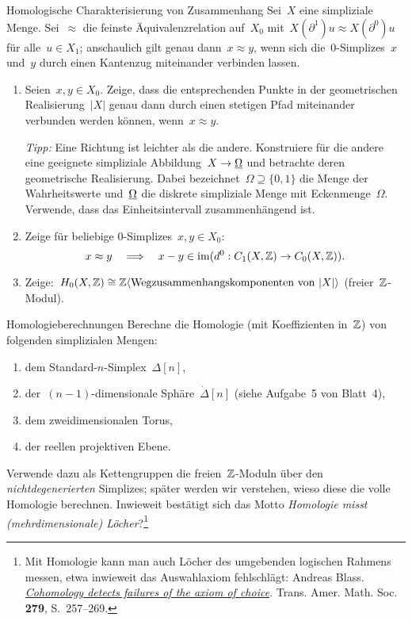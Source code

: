 \documentclass{uebblatt}
\begin{document}

\begin{aufgabe}{Homologische Charakterisierung von Zusammenhang}
Sei~$X$ eine simpliziale Menge. Sei~$\approx$ die feinste Äquivalenzrelation
auf~$X_0$ mit~$X(\partial^1)u \approx X(\partial^0)u$ für alle~$u \in X_1$;
anschaulich gilt genau dann~$x \approx y$, wenn sich die~0-Simplizes~$x$
und~$y$ durch einen Kantenzug miteinander verbinden lassen.
\begin{enumerate}
\item Seien~$x,y \in X_0$. Zeige, dass die entsprechenden Punkte in der
geometrischen Realisierung~$|X|$ genau dann durch einen stetigen Pfad
miteinander verbunden werden können, wenn~$x \approx y$.

\emph{Tipp:} Eine Richtung ist leichter als die andere. Konstruiere für die
andere eine geeignete simpliziale Abbildung~$X \to \underline{\Omega}$ und betrachte
deren geometrische Realisierung. Dabei bezeichnet~$\Omega \supseteq \{0,1\}$ die
Menge der Wahrheitswerte und~$\underline{\Omega}$ die diskrete simpliziale Menge mit
Eckenmenge~$\Omega$. Verwende, dass das Einheitsintervall zusammenhängend ist.

\item Zeige für beliebige 0-Simplizes~$x,y \in X_0$:
\[ x \approx y
  \quad\Longrightarrow\quad
  x - y \in \operatorname{im}(d^0 : C_1(X,\mathbb{Z}) \to C_0(X,\mathbb{Z})). \]

\item Zeige:~$H_0(X,\mathbb{Z}) \cong \mathbb{Z}\langle \text{Wegzusammenhangskomponenten
von~$|X|$} \rangle$ (freier~$\mathbb{Z}$-Modul).
\end{enumerate}
\end{aufgabe}

\begin{aufgabe}{Homologieberechnungen}
Berechne die Homologie (mit Koeffizienten in~$\mathbb{Z}$) von folgenden simplizialen
Mengen:
\begin{enumerate}
\item dem Standard-$n$-Simplex~$\Delta[n]$,
\item der~$(n-1)$-dimensionale Sphäre~$\dot\Delta[n]$ (siehe Aufgabe~5 von Blatt~4),
\item dem zweidimensionalen Torus,
\item der reellen projektiven Ebene.
\end{enumerate}
Verwende dazu als Kettengruppen die freien~$\mathbb{Z}$-Moduln über den
\emph{nichtdegenerierten} Simplizes; später werden wir verstehen, wieso diese
die volle Homologie berechnen. Inwieweit bestätigt sich das Motto \emph{Homologie misst
(mehrdimensionale) Löcher}?\footnote{Mit Homologie kann man auch Löcher des
umgebenden logischen Rahmens messen, etwa inwieweit das Auswahlaxiom
fehlschlägt: Andreas Blass.
\emph{\href{http://www.ams.org/journals/tran/1983-279-01/S0002-9947-1983-0704615-7/S0002-9947-1983-0704615-7.pdf}{Cohomology detects failures of the axiom of
choice}}. Trans. Amer. Math. Soc. \textbf{279}, S.~257--269.}
\end{aufgabe}
\end{document}
